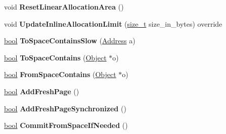 \begin{DoxyCompactItemize}
\item 
\mbox{\label{classv8_1_1internal_1_1NewSpace_acb29157c14ff02ecfe47e1f634f8998b}} 
void {\bfseries Reset\+Linear\+Allocation\+Area} ()
\item 
\mbox{\label{classv8_1_1internal_1_1NewSpace_a73cdd658565c97aaa2fab680b626988d}} 
void {\bfseries Update\+Inline\+Allocation\+Limit} (\mbox{\hyperlink{classsize__t}{size\+\_\+t}} size\+\_\+in\+\_\+bytes) override
\item 
\mbox{\label{classv8_1_1internal_1_1NewSpace_ad55fc284cc2fe7b72edc120cd76ea285}} 
\mbox{\hyperlink{classbool}{bool}} {\bfseries To\+Space\+Contains\+Slow} (\mbox{\hyperlink{classuintptr__t}{Address}} a)
\item 
\mbox{\label{classv8_1_1internal_1_1NewSpace_a560c4efe48c8217a5fc3880b89dd664d}} 
\mbox{\hyperlink{classbool}{bool}} {\bfseries To\+Space\+Contains} (\mbox{\hyperlink{classv8_1_1internal_1_1Object}{Object}} $\ast$o)
\item 
\mbox{\label{classv8_1_1internal_1_1NewSpace_a543190278789f732a664226eef5253ca}} 
\mbox{\hyperlink{classbool}{bool}} {\bfseries From\+Space\+Contains} (\mbox{\hyperlink{classv8_1_1internal_1_1Object}{Object}} $\ast$o)
\item 
\mbox{\label{classv8_1_1internal_1_1NewSpace_a744459ffa6773c735d730165c2474fe1}} 
\mbox{\hyperlink{classbool}{bool}} {\bfseries Add\+Fresh\+Page} ()
\item 
\mbox{\label{classv8_1_1internal_1_1NewSpace_acbe47769af3df0ebea54d805716b9695}} 
\mbox{\hyperlink{classbool}{bool}} {\bfseries Add\+Fresh\+Page\+Synchronized} ()
\item 
\mbox{\label{classv8_1_1internal_1_1NewSpace_a9f14d02d53653fcaca7c4b18d4f93984}} 
\mbox{\hyperlink{classbool}{bool}} {\bfseries Commit\+From\+Space\+If\+Needed} ()
\item 
\mbox{\label{classv8_1_1internal_1_1NewSpace_aa96d85e9b611f7e6ab4f555ad63ab4d9}} 

\end{DoxyCompactItemize}
